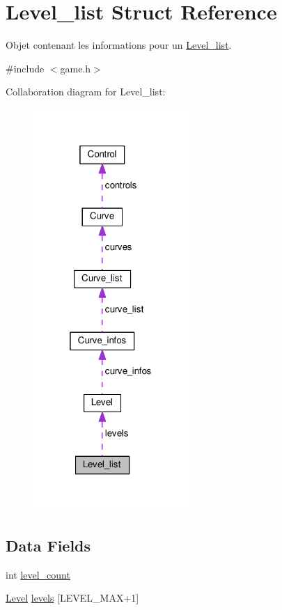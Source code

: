 \hypertarget{struct_level__list}{}\section{Level\+\_\+list Struct Reference}
\label{struct_level__list}


Objet contenant les informations pour un \hyperlink{struct_level__list}{Level\+\_\+list}.  




{\ttfamily \#include $<$game.\+h$>$}



Collaboration diagram for Level\+\_\+list\+:
\nopagebreak
\begin{figure}[H]
\begin{center}
\leavevmode
\includegraphics[width=169pt]{struct_level__list__coll__graph}
\end{center}
\end{figure}
\subsection*{Data Fields}
\begin{DoxyCompactItemize}
\item 
int \hyperlink{struct_level__list_a15a1d581c38f5a80cf12ac022ad6c600}{level\+\_\+count}
\item 
\hyperlink{struct_level}{Level} \hyperlink{struct_level__list_a3dc8b993b65462f76626717e082e4e72}{levels} \mbox{[}L\+E\+V\+E\+L\+\_\+\+M\+AX+1\mbox{]}
\end{DoxyCompactItemize}


